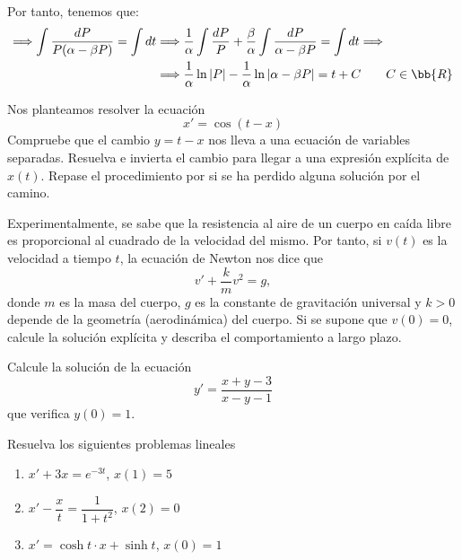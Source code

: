 \begin{ejercicio}
    Por tanto, tenemos que:
    \begin{align*}
        \Longrightarrow \int \dfrac{dP}{P(\alpha - \beta P)} = \int dt
        &\Longrightarrow \frac{1}{\alpha}\int \dfrac{dP}{P} + \frac{\beta}{\alpha}\int \dfrac{dP}{\alpha - \beta P} = \int dt \Longrightarrow \\ &\Longrightarrow \dfrac{1}{\alpha}\ln|P| - \dfrac{1}{\alpha}\ln|\alpha - \beta P| = t + C \qquad C\in \bb{R}
    \end{align*}

\end{ejercicio}

\begin{ejercicio}
    Nos planteamos resolver la ecuación
    \begin{equation*}
        x' = \cos(t - x)
    \end{equation*}
    Compruebe que el cambio $y = t - x$ nos lleva a una ecuación de variables separadas. Resuelva e invierta el cambio para llegar a una expresión explícita de $x(t)$. Repase el procedimiento por si se ha perdido alguna solución por el camino.
\end{ejercicio}

\begin{ejercicio}
    Experimentalmente, se sabe que la resistencia al aire de un cuerpo en caída libre es proporcional al cuadrado de la velocidad del mismo. Por tanto, si $v(t)$ es la velocidad a tiempo $t$, la ecuación de Newton nos dice que
    \begin{equation*}
        v' + \dfrac{k}{m}v^2 = g,
    \end{equation*}
    donde $m$ es la masa del cuerpo, $g$ es la constante de gravitación universal y $k > 0$ depende de la geometría (aerodinámica) del cuerpo. Si se supone que $v(0) = 0$, calcule la solución explícita y describa el comportamiento a largo plazo.
\end{ejercicio}

\begin{ejercicio}
    Calcule la solución de la ecuación
    \begin{equation*}
        y' = \dfrac{x + y - 3}{x - y - 1}
    \end{equation*}
    que verifica $y(0) = 1$.
\end{ejercicio}

\begin{ejercicio}
    Resuelva los siguientes problemas lineales
    \begin{enumerate}
        \item $x' + 3x = e^{-3t}$, $x(1) = 5$
        \item $x' - \dfrac{x}{t} = \dfrac{1}{1+t^2}$, $x(2) = 0$
        \item $x' = \cosh t \cdot x + \sinh t$, $x(0) = 1$
    \end{enumerate}
\end{ejercicio}

